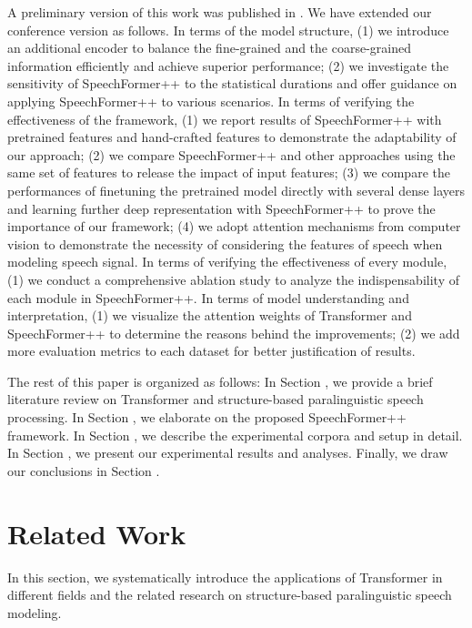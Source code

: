 \documentclass[lettersize,journal]{IEEEtran}
\begin{document}
A preliminary version of this work was published in \cite{speechformer}. We have extended our conference version as follows.
In terms of the model structure, (1) we introduce an additional encoder to balance the fine-grained and the coarse-grained information efficiently and achieve superior performance; (2) we investigate the sensitivity of SpeechFormer++ to the statistical durations and offer guidance on applying SpeechFormer++ to various scenarios.
In terms of verifying the effectiveness of the framework, (1) we report results of SpeechFormer++ with pretrained features and hand-crafted features to demonstrate the adaptability of our approach; (2) we compare SpeechFormer++ and other approaches using the same set of features to release the impact of input features; (3) we compare the performances of finetuning the pretrained model directly with several dense layers and learning further deep representation with SpeechFormer++ to prove the importance of our framework; (4) we adopt attention mechanisms from computer vision to demonstrate the necessity of considering the features of speech when modeling speech signal.
In terms of verifying the effectiveness of every module, (1) we conduct a comprehensive ablation study to analyze the indispensability of each module in SpeechFormer++.
In terms of model understanding and interpretation, (1) we visualize the attention weights of Transformer and SpeechFormer++ to determine the reasons behind the improvements; (2) we add more evaluation metrics to each dataset for better justification of results.

The rest of this paper is organized as follows: In Section \uppercase\expandafter{}, we provide a brief literature review on Transformer and structure-based paralinguistic speech processing. In Section \uppercase\expandafter{}, we elaborate on the proposed SpeechFormer++ framework. In Section \uppercase\expandafter{}, we describe the experimental corpora and setup in detail. In Section \uppercase\expandafter{}, we present our experimental results and analyses. Finally, we draw our conclusions in Section \uppercase\expandafter{}.

\section{Related Work}
In this section, we systematically introduce the applications of Transformer in different fields and the related research on structure-based paralinguistic speech modeling.
\end{document}
